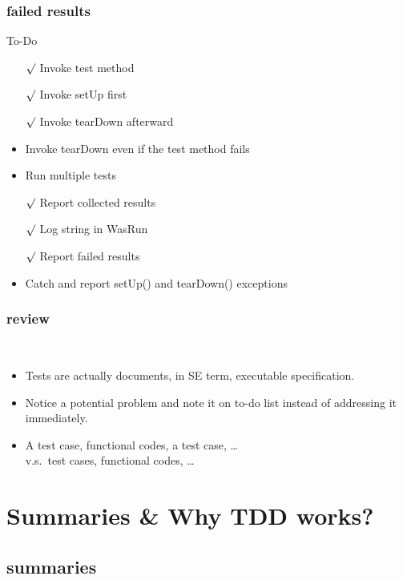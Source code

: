 \documentclass[lualatex]{beamer}
\begin{document}
\begin{frame}
  \frametitle{failed results}

  \begin{block}{To-Do}
    \begin{itemize}
    \item[$\surd$] Invoke test method
    \item[$\surd$] Invoke setUp first 
    \item[$\surd$] Invoke tearDown afterward 
    \item Invoke tearDown even if the test method fails 
    \item Run multiple tests 
    \item[$\surd$] Report collected results 
    \item[$\surd$] Log string in WasRun 
    \item[$\surd$] Report failed results
    \item Catch and report setUp() and tearDown() exceptions
    \end{itemize}
  \end{block}
\end{frame}

\begin{frame}
  \frametitle{review}

  \begin{block}{~}
    \begin{itemize}
    \item 
      Tests are actually documents, in SE term, executable specification.
    \item 
      Notice a potential problem and note it on to-do list instead of addressing it immediately.
    \item 
      A test case, functional codes, a test case, \ldots\\
      v.s.\ test cases, functional codes, \ldots
    \end{itemize}
  \end{block}

\end{frame}

\section{Summaries \& Why TDD works?}

\subsection{summaries}
\end{document}
